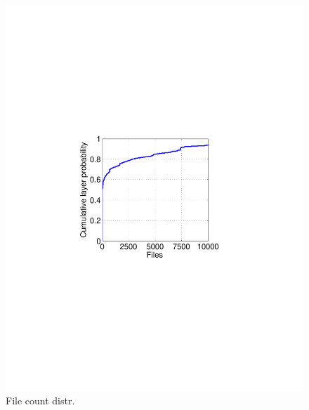 \begin{figure}
	\centering
	\begin{minipage}{0.23\textwidth}
		\centering
		\includegraphics[width=1\textwidth]{graphs/file_cnt.pdf}
		\caption{File count distr.}
		\label{fig_file_cnt}
	\end{minipage}
	\begin{minipage}{0.23\textwidth}
		\centering

\end{minipage}
\end{figure}
